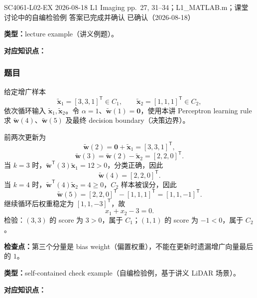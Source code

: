 

\examplemeta
  {SC4061-L02-EX}
  {2026-08-18}
  {L1 Imaging pp.~27, 31--34；L1\_MATLAB.m；课堂讨论中的自编检验例}
  {答案已完成并确认}
  {已确认（2026-08-18）}


\textbf{类型：}lecture example（讲义例题）。

\textbf{对应知识点：}

\subsubsection*{题目}

给定增广样本
\[
  \tilde{\bm x}_1=[3,3,1]^{\mathsf T}\in C_1,
  \qquad
  \tilde{\bm x}_2=[1,1,1]^{\mathsf T}\in C_2,
\]
依次循环输入 $\tilde{\bm x}_1,\tilde{\bm x}_2$。令 $\alpha=1$、$\tilde{\bm w}(1)=\bm 0$，使用本讲 Perceptron learning rule 求 $\tilde{\bm w}(4)$、$\tilde{\bm w}(5)$ 及最终 decision boundary（决策边界）。

\begin{checkedsolution}
前两次更新为
\[
  \tilde{\bm w}(2)=\bm0+\tilde{\bm x}_1=[3,3,1]^{\mathsf T},
\]
\[
  \tilde{\bm w}(3)=\tilde{\bm w}(2)-\tilde{\bm x}_2
  =[2,2,0]^{\mathsf T}.
\]
当 $k=3$ 时，$\tilde{\bm w}^{\mathsf T}(3)\tilde{\bm x}_1=12>0$，分类正确，因此
\[
  \boxed{\tilde{\bm w}(4)=[2,2,0]^{\mathsf T}}.
\]
当 $k=4$ 时，$\tilde{\bm w}^{\mathsf T}(4)\tilde{\bm x}_2=4\ge0$，$C_2$ 样本被误分，因此
\[
  \boxed{\tilde{\bm w}(5)=[2,2,0]^{\mathsf T}-[1,1,1]^{\mathsf T}
  =[1,1,-1]^{\mathsf T}}.
\]
继续循环后权重稳定为 $[1,1,-3]^{\mathsf T}$，故
\[
  \boxed{x_1+x_2-3=0}.
\]
检验：$(3,3)$ 的 score 为 $3>0$，属于 $C_1$；$(1,1)$ 的 score 为 $-1<0$，属于 $C_2$。
\end{checkedsolution}

\textbf{检查点：}第三个分量是 bias weight（偏置权重），不能在更新时遗漏增广向量最后的 $1$。


\textbf{类型：}self-contained check example（自编检验例，基于讲义 LiDAR 场景）。

\textbf{对应知识点：}

